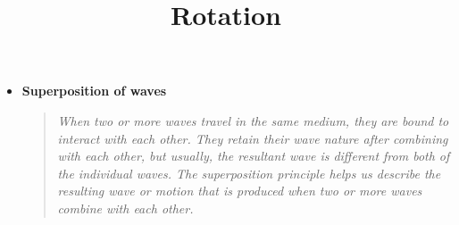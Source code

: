 \documentclass[11pt]{article}
\title{Rotation}
\begin{document}
\maketitle


\begin{itemize}
\item 
\begin{center}
    \textbf{Superposition of waves}
    \begin{quote}
        \textit{When two or more waves travel in the same medium, they are bound to interact with each other. They retain their wave nature after combining with each other, but usually, the resultant wave is different from both of the individual waves. The superposition principle helps us describe the resulting wave or motion that is produced when two or more waves combine with each other. }
    \end{quote}
\end{center}


\end{itemize}
\end{document}
